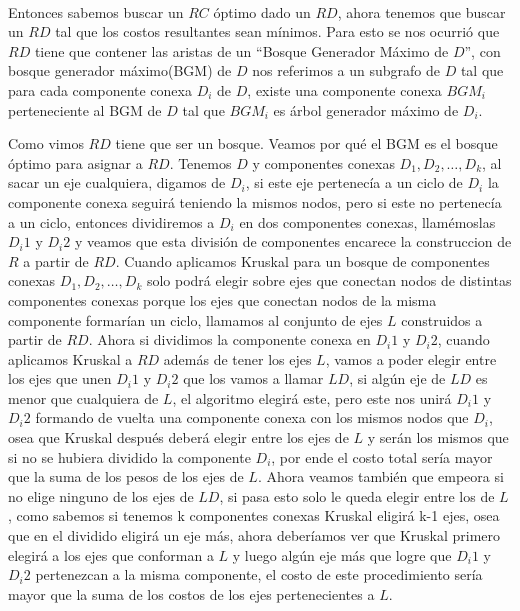 \\
\par
Entonces sabemos buscar un $RC$ óptimo dado un $RD$, ahora tenemos que buscar un $RD$ tal que los costos resultantes sean mínimos. Para esto se nos ocurrió que $RD$ tiene que contener las aristas de un “Bosque Generador Máximo de $D$”, con bosque generador máximo(BGM) de $D$ nos referimos a un subgrafo de $D$ tal que para cada componente conexa $D_i$ de $D$, existe una componente conexa $BGM_i$ perteneciente al BGM de $D$ tal que $BGM_i$ es árbol generador máximo de $D_i$. 
\\
\par
Como vimos $RD$ tiene que ser un bosque. Veamos por qué el BGM es el bosque óptimo para asignar a $RD$. Tenemos $D$ y componentes conexas $D_1 , D_2 , … , D_k$, al sacar un eje cualquiera, digamos de $D_i$, si este eje pertenecía a un ciclo de $D_i$ la componente conexa seguirá teniendo la mismos nodos, pero si este no pertenecía a un ciclo, entonces dividiremos a $D_i$ en dos componentes conexas, llamémoslas $D_i1$ y $D_i2$ y veamos que esta división de componentes encarece la construccion de $R$ a partir de $RD$. Cuando aplicamos Kruskal para un bosque de componentes conexas $D_1 , D_2 , … , D_k$ solo podrá elegir sobre ejes que conectan nodos de distintas componentes conexas porque los ejes que conectan nodos de la misma componente formarían un ciclo, llamamos al conjunto de ejes $L$ construidos a partir de $RD$. Ahora si dividimos la componente conexa en $D_i1$ y $D_i2$, cuando aplicamos Kruskal a $RD$ además de tener los ejes $L$, vamos a poder elegir entre los ejes que unen $D_i1$ y $D_i2$ que los vamos a llamar $LD$, si algún eje de $LD$ es menor que cualquiera de $L$, el algoritmo elegirá este, pero este nos unirá  $D_i1$ y $D_i2$ formando de vuelta una componente conexa con los mismos nodos que $D_i$, osea que Kruskal después deberá elegir entre los ejes de $L$ y serán los mismos que si no se hubiera dividido la componente $D_i$, por ende el costo total sería mayor que la suma de los pesos de los ejes de $L$. Ahora veamos también que empeora si no elige ninguno de los ejes de $LD$, si pasa esto solo le queda elegir entre los de $L$, como sabemos si tenemos k componentes conexas Kruskal eligirá k-1 ejes, osea que en el dividido eligirá un eje más, ahora deberíamos ver que Kruskal primero elegirá a los ejes que conforman a $L$ y luego algún eje más que logre que $D_i1$ y $D_i2$ pertenezcan a la misma componente, el costo de este procedimiento sería mayor que la suma de los costos de los ejes pertenecientes a $L$.
